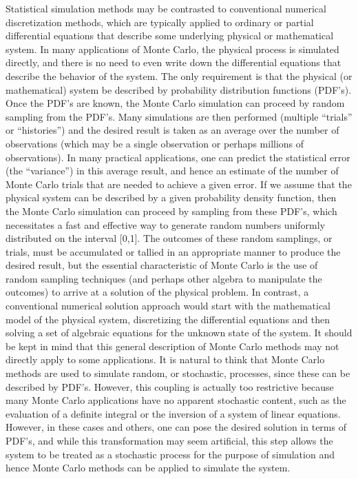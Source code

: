 Statistical simulation methods may be contrasted to conventional numerical discretization
methods, which are typically applied to ordinary or partial differential equations that describe
some underlying physical or mathematical system. In many applications of Monte Carlo, the
physical process is simulated directly, and there is no need to even write down the differential
equations that describe the behavior of the system. 
The only requirement is that the physical (or
mathematical) system be described by probability distribution functions (PDF's).
Once the PDF's are known, the Monte Carlo simulation can
proceed by random sampling from the PDF's. Many simulations are then performed (multiple
``trials'' or ``histories'') and the desired result is taken as an average over the number of
observations (which may be a single observation or perhaps millions of observations). In many
practical applications, one can predict the statistical error (the ``variance'') in this average
result, and hence an estimate of the number of Monte Carlo trials that are needed to achieve a
given error. If we assume that the physical system can be described by a given probability
density function, then the Monte Carlo simulation can proceed by sampling
from these PDF's, which necessitates a fast and effective way to generate random numbers
uniformly distributed on the interval [0,1]. The outcomes of these random samplings, or trials,
must be accumulated or tallied in an appropriate manner to produce the desired result, but the
essential characteristic of Monte Carlo is the use of random sampling techniques (and perhaps
other algebra to manipulate the outcomes) to arrive at a solution of the physical problem. In
contrast, a conventional numerical solution approach would start with the mathematical model
of the physical system, discretizing the differential equations 
and then solving a set of algebraic
equations for the unknown state of the system. 
It should be kept in mind that this general description of Monte Carlo methods may not
directly apply to some applications. It is natural to think that Monte Carlo methods are used to
simulate random, or stochastic, processes, since these can be described by PDF's. However, this
coupling is actually too restrictive because many Monte Carlo applications have no apparent
stochastic content, such as the evaluation of a definite integral 
or the inversion of a system of
linear equations. However, in these cases and others, one can pose the desired solution in terms
of PDF's, and while this transformation may seem artificial, this step allows the system to be
treated as a stochastic process for the purpose of simulation and hence Monte Carlo methods
can be applied to simulate the system. 

